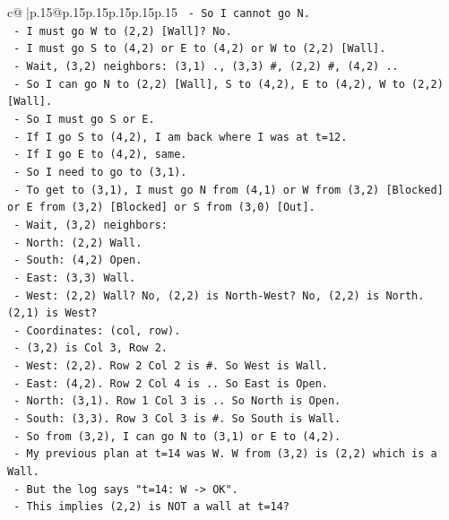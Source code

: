 \documentclass{article}
\begin{document}
{\begin{supertabular}{c@{$\;$}|p{.15\linewidth}@{}p{.15\linewidth}p{.15\linewidth}p{.15\linewidth}p{.15\linewidth}p{.15\linewidth}}
{{{\texttt{    {-} So I cannot go N.} \\
\texttt{    {-} I must go W to (2,2) {[}Wall{]}? No.} \\
\texttt{    {-} I must go S to (4,2) or E to (4,2) or W to (2,2) {[}Wall{]}.} \\
\texttt{    {-} Wait, (3,2) neighbors: (3,1) ., (3,3) \#, (2,2) \#, (4,2) ..} \\
\texttt{    {-} So I can go N to (2,2) {[}Wall{]}, S to (4,2), E to (4,2), W to (2,2) {[}Wall{]}.} \\
\texttt{    {-} So I must go S or E.} \\
\texttt{    {-} If I go S to (4,2), I am back where I was at t=12.} \\
\texttt{    {-} If I go E to (4,2), same.} \\
\texttt{    {-} So I need to go to (3,1).} \\
\texttt{    {-} To get to (3,1), I must go N from (4,1) or W from (3,2) {[}Blocked{]} or E from (3,2) {[}Blocked{]} or S from (3,0) {[}Out{]}.} \\
\texttt{    {-} Wait, (3,2) neighbors:} \\
\texttt{      {-} North: (2,2) Wall.} \\
\texttt{      {-} South: (4,2) Open.} \\
\texttt{      {-} East: (3,3) Wall.} \\
\texttt{      {-} West: (2,2) Wall? No, (2,2) is North{-}West? No, (2,2) is North. (2,1) is West?} \\
\texttt{      {-} Coordinates: (col, row).} \\
\texttt{      {-} (3,2) is Col 3, Row 2.} \\
\texttt{      {-} West: (2,2). Row 2 Col 2 is \#. So West is Wall.} \\
\texttt{      {-} East: (4,2). Row 2 Col 4 is .. So East is Open.} \\
\texttt{      {-} North: (3,1). Row 1 Col 3 is .. So North is Open.} \\
\texttt{      {-} South: (3,3). Row 3 Col 3 is \#. So South is Wall.} \\
\texttt{    {-} So from (3,2), I can go N to (3,1) or E to (4,2).} \\
\texttt{    {-} My previous plan at t=14 was W. W from (3,2) is (2,2) which is a Wall.} \\
\texttt{    {-} But the log says "t=14: W {-}> OK".} \\
\texttt{    {-} This implies (2,2) is NOT a wall at t=14?} \\
}}}
\end{supertabular}}
\end{document}
